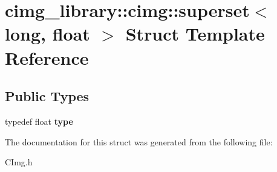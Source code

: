 \hypertarget{structcimg__library_1_1cimg_1_1superset_3_01long_00_01float_01_4}{\section{cimg\-\_\-library\-:\-:cimg\-:\-:superset$<$ long, float $>$ Struct Template Reference}
\label{structcimg__library_1_1cimg_1_1superset_3_01long_00_01float_01_4}
}
\subsection*{Public Types}
\begin{DoxyCompactItemize}
\item 
\hypertarget{structcimg__library_1_1cimg_1_1superset_3_01long_00_01float_01_4_a34f9cd95ad9d9b6d92e87cbce4e183f8}{typedef float {\bfseries type}}\label{structcimg__library_1_1cimg_1_1superset_3_01long_00_01float_01_4_a34f9cd95ad9d9b6d92e87cbce4e183f8}

\end{DoxyCompactItemize}


The documentation for this struct was generated from the following file\-:\begin{DoxyCompactItemize}
\item 
C\-Img.\-h\end{DoxyCompactItemize}
